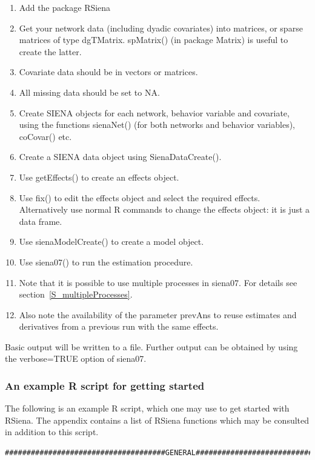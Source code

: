 \documentclass[a4paper,fleqn]{article}
\newcommand{\+}{\, + \,}
\newcommand{\sfn}[1]{\textsf{#1}}
\newcommand{\R}{{\sf R }}
\newcommand{\rs}{{\sf RSiena}}
\newcommand{\RS}{{\sf RSiena }}
\newcommand{\SI}{{\sf SIENA }}
\begin{document}
{\begin{enumerate}
\item Add the package \RS
\item Get your network data (including dyadic covariates)
   into matrices, or sparse matrices of type
  \sfn{dgTMatrix}. \sfn{spMatrix()} (in package \sfn{Matrix}) is useful to
  create the latter.
\item Covariate data should be in vectors or matrices.
\item All missing data should be set to NA.
\item Create \SI objects for each network, behavior variable and covariate,
  using the functions \sfn{sienaNet()} (for both networks and behavior
  variables), \sfn{coCovar()} etc.
\item Create a \SI data object using \sfn{SienaDataCreate()}.
\item Use \sfn{getEffects()} to create an effects object.
\item Use \sfn{fix()} to edit the effects object and select the required
  effects. Alternatively use normal \R commands to change the effects object: it
  is just a data frame.
\item Use \sfn{sienaModelCreate()} to create a model object.
\item Use \sfn{siena07()} to run the estimation procedure.
\item Note that it is possible to use multiple processes in \sfn{siena07}. For
  details see section~\ref{S_multipleProcesses}.
\item Also note the availability of the parameter \sfn{prevAns} to reuse
  estimates and derivatives from a previous run with the same effects.
\end{enumerate}
Basic output will be written to a file. Further output can be obtained by using
the \sfn{verbose=TRUE} option of \sfn{siena07}.

\subsubsection{An example \R script for getting started}
\label{S_Rscript}

The following is an example \R script,
which one may use to get started with \rs.
The appendix contains a list of \RS functions which may be consulted
in addition to this script.

\begin{verbatim}
#####################################GENERAL###################################


\end{verbatim}}
\end{document}
